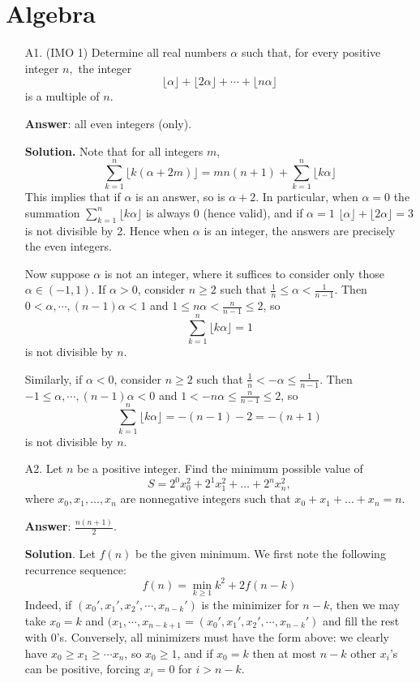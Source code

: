 \documentclass[11pt,a4paper]{article}
\begin{document}
	\section*{Algebra}
	\begin{enumerate}
		\item [A1.] (IMO 1)
		Determine all real numbers $\alpha$ such that, for every positive integer $n,$ the integer
		$$\lfloor\alpha\rfloor +\lfloor 2\alpha\rfloor +\cdots +\lfloor n\alpha\rfloor$$is a multiple of $n.$
		
		\textbf{Answer}: all even integers (only). 
		
		\textbf{Solution.}
		Note that for all integers $m$, 
		\[\sum_{k=1}^n \lfloor k(\alpha + 2m)\rfloor 
		=mn(n + 1) + \sum_{k=1}^n \lfloor k\alpha\rfloor 
		\]
		This implies that if $\alpha$ is an answer, so is $\alpha + 2$. 
		In particular, when $\alpha = 0$ the summation 
		$\sum_{k=1}^n \lfloor k\alpha\rfloor$ is always 0 
		(hence valid), 
		and if $\alpha = 1$ $\lfloor \alpha\rfloor + \lfloor 2\alpha\rfloor = 3$ is not divisible by 2. 
		Hence when $\alpha$ is an integer, the answers are precisely the even integers. 
		
		Now suppose $\alpha$ is not an integer, 
		where it suffices to consider only those $\alpha\in (-1, 1)$. 
		If $\alpha > 0$, 
		consider $n\ge 2$ such that $\frac{1}{n} \le \alpha < \frac{1}{n - 1}$. 
		Then $0 < \alpha, \cdots, (n - 1)\alpha < 1$ and 
		$1\le n\alpha < \frac{n}{n - 1}\le 2$, 
		so 
		\[
		\sum_{k=1}^n \lfloor k\alpha\rfloor = 1
		\]
		is not divisible by $n$. 
		
		Similarly, if $\alpha < 0$, 
		consider $n\ge 2$ such that $\frac{1}{n} < -\alpha \le \frac{1}{n - 1}$. 
		Then $-1 \le \alpha, \cdots, (n - 1)\alpha < 0$ and 
		$1 < -n\alpha \le \frac{n}{n - 1}\le 2$, 
		so 
		\[
		\sum_{k=1}^n \lfloor k\alpha\rfloor = -(n - 1) - 2 = -(n + 1)
		\]
		is not divisible by $n$. 
		
		\item [A2.]
		Let $n$ be a positive integer. Find the minimum possible value of
		\[
		S = 2^0 x_0^2 + 2^1 x_1^2 + \dots + 2^n x_n^2,
		\]where $x_0, x_1, \dots, x_n$ are nonnegative integers such that $x_0 + x_1 + \dots + x_n = n$.
		
		\textbf{Answer}: $\frac{n(n+1)}{2}$. 
		
		\textbf{Solution}. 
		Let $f(n)$ be the given minimum. 
		We first note the following recurrence sequence: 
		\[
		f(n) = \min_{k\ge 1} k^2 + 2f(n - k)
		\]
		Indeed, if $(x_0', x_1', x_2', \cdots, x_{n - k}')$ is the minimizer for $n - k$, 
		then we may take $x_0 = k$ and $(x_1, \cdots, x_{n - k + 1} = (x_0', x_1', x_2', \cdots, x_{n - k}')$ and fill the rest with 0's. 
		Conversely, all minimizers must have the form above: 
		we clearly have $x_0\ge x_1\ge\cdots x_n$, so $x_0\ge 1$, 
		and if $x_0 = k$ then at most $n - k$ other $x_i$'s can be positive, 
		forcing $x_i = 0$ for $i > n - k$. 
		

\end{enumerate}
\end{document}
